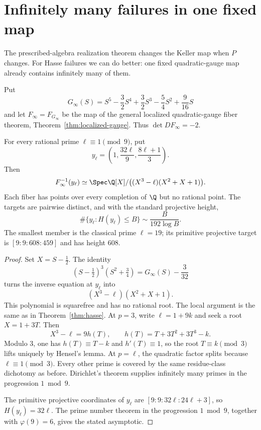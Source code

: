 \section{Infinitely many failures in one fixed map}\label{sec:infinite}

The prescribed-algebra realization theorem changes the Keller map when $P$
changes.  For Hasse failures we can do better: one fixed quadratic-gauge map
already contains infinitely many of them.

Put
\[
 G_\infty(S)=S^5-\frac32S^4+\frac32S^3
             -\frac54S^2+\frac9{16}S
\]
and let $F_\infty=F_{G_\infty}$ be the map of the general localized
quadratic-gauge fiber theorem, Theorem~\ref{thm:localized-gauge}.  Thus
$\det DF_\infty=-2$.

\begin{theorem}
For every rational prime $\ell\equiv1\pmod9$, put
\[
 y_\ell=
 \left(1,\frac{32\ell}{9},\frac{8\ell+1}{3}\right).
\]
Then
\[
 F_\infty^{-1}(y_\ell)
 \simeq
 \Spec\Q[X]/\bigl((X^3-\ell)(X^2+X+1)\bigr).
\]
Each fiber has points over every completion of $\Q$ but no rational point.
The targets are pairwise distinct, and with the standard projective height,
\[
 \#\{y_\ell:H(y_\ell)\leq B\}
 \sim\frac{B}{192\log B}.
\]
The smallest member is the classical prime $\ell=19$; its primitive
projective target is $[9:9:608:459]$ and has height $608$.
\end{theorem}

\begin{proof}
Set $X=S-\tfrac12$.  The identity
\[
 (S-\tfrac12)^3(S^2+\tfrac34)=G_\infty(S)-\frac3{32}
\]
turns the inverse equation at $y_\ell$ into
\[
 (X^3-\ell)(X^2+X+1).
\]
This polynomial is squarefree and has no rational root.  The local argument is
the same as in Theorem~\ref{thm:hasse}.  At $p=3$, write $\ell=1+9k$ and
seek a root $X=1+3T$.  Then
\[
 X^3-\ell=9h(T),\qquad h(T)=T+3T^2+3T^3-k.
\]
Modulo $3$, one has $h(T)\equiv T-k$ and $h'(T)\equiv1$, so the root
$T\equiv k\pmod3$ lifts uniquely by Hensel's lemma.  At
$p=\ell$, the quadratic factor splits because $\ell\equiv1\pmod3$.  Every
other prime is covered by the same residue-class dichotomy as before.
Dirichlet's theorem supplies infinitely many primes in the progression
$1\bmod9$.

The primitive projective coordinates of $y_\ell$ are
$[9:9:32\ell:24\ell+3]$, so $H(y_\ell)=32\ell$.  The prime number theorem in
the progression $1\bmod9$, together with $\varphi(9)=6$, gives the stated
asymptotic.
\end{proof}
